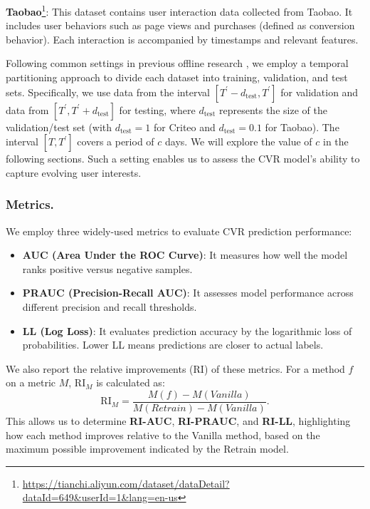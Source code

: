 \textbf{Taobao}\footnote{\url{https://tianchi.aliyun.com/dataset/dataDetail?dataId=649&userId=1&lang=en-us}}: This dataset contains user interaction data collected from Taobao. It includes user behaviors such as page views and purchases (defined as conversion behavior). Each interaction is accompanied by timestamps and relevant features. 

Following common settings in previous offline research \cite{wang2023unbiased,yasui2020feedback}, we employ a temporal partitioning approach to divide each dataset into training, validation, and test sets. Specifically, we use data from the interval $\left[T^{\prime}-d_\text{test}, T^{\prime}\right]$ for validation and data from $\left[T^{\prime}, T^{\prime}+d_\text{test}\right]$ for testing, where $d_\text{test}$ represents the size of the validation/test set (with $d_\text{test}=1$ for Criteo and $d_\text{test}=0.1$ for Taobao).  The interval $\left[T, T^{\prime}\right]$ covers a period of $c$ days. We will explore the value of $c$ in the following sections. Such a setting enables us to assess the CVR model's ability to capture evolving user interests.

\subsubsection{Metrics.}
We employ three widely-used metrics \cite{wang2023unbiased, dai2023dually} to evaluate CVR prediction performance:
\begin{itemize}[leftmargin=*]
    \item \textbf{AUC (Area Under the ROC Curve)}: It measures how well the model ranks positive versus negative samples. 
    \item \textbf{PRAUC (Precision-Recall AUC)}: It assesses model performance across different precision and recall thresholds. 
    \item \textbf{LL (Log Loss)}: It evaluates prediction accuracy by the logarithmic loss of probabilities. Lower LL means predictions are closer to actual labels.
\end{itemize}
We also report the relative improvements (RI) of these metrics. For a method $f$ on a metric $M$, $\mathrm{RI}_M$ is calculated as:
\begin{equation}
\mathrm{RI}_M=\frac{M(f)-M( Vanilla )}{M( Retrain )-M ( Vanilla )}.
\end{equation}
This allows us to determine \textbf{RI-AUC}, \textbf{RI-PRAUC}, and \textbf{RI-LL}, highlighting how each method improves relative to the Vanilla method, based on the maximum possible improvement indicated by the Retrain model.

